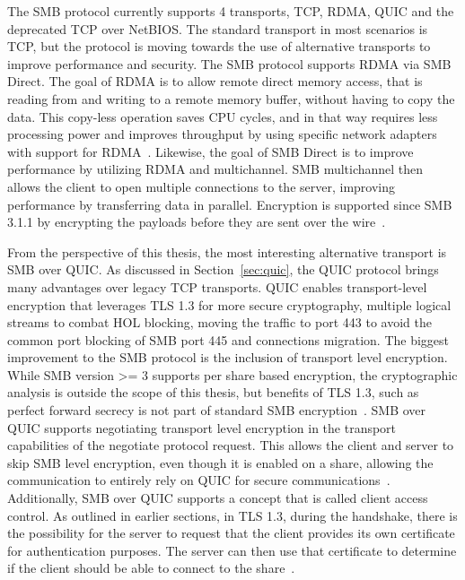 \documentclass[english, 12pt, a4paper, elec, utf8, a-2b, online]{aaltothesis}
\begin{document}
The SMB protocol currently supports 4 transports, TCP, RDMA, QUIC and the
deprecated TCP over NetBIOS. The standard transport in most scenarios is TCP,
but the protocol is moving towards the use of alternative transports to improve
performance and security. The SMB protocol supports RDMA via SMB Direct. The goal
of RDMA is to allow remote direct memory access, that is reading from and writing
to a remote memory buffer, without having to copy the data. This copy-less operation saves CPU
cycles, and in that way requires less processing power and improves throughput
by using specific network adapters with support for RDMA~\cite{rfc5040}.
Likewise, the goal of SMB Direct is to improve performance by utilizing RDMA
and multichannel. SMB multichannel then allows the client to open multiple connections
to the server, improving performance by transferring data in parallel. Encryption is
supported since SMB 3.1.1 by encrypting the payloads before they are sent over the
wire~\cite{smb_direct}.

From the perspective of this thesis, the most interesting alternative transport is
SMB over QUIC. As discussed in Section~\ref{sec:quic}, the QUIC protocol brings
many advantages over legacy TCP transports. QUIC enables transport-level encryption
that leverages TLS 1.3 for more secure cryptography, multiple logical streams
to combat HOL blocking, moving the traffic to port 443 to avoid the common port
blocking of SMB port 445 and connections migration. The biggest improvement to the
SMB protocol is the inclusion of transport level encryption. While SMB version >= 3
supports per share based encryption, the cryptographic analysis is outside the scope
of this thesis, but benefits of TLS 1.3, such as perfect forward secrecy is not
part of standard SMB encryption~\cite{smb_quic}. SMB over QUIC supports negotiating
transport level encryption in the transport capabilities of the negotiate protocol
request. This allows the client and server to skip SMB level encryption, even though
it is enabled on a share, allowing the communication to entirely rely on QUIC for
secure communications~\cite{smb2_tech}. Additionally, SMB over QUIC supports a concept
that is called client access control. As outlined in earlier sections, in TLS 1.3,
during the handshake,  there is the possibility for the server to request that the client
provides its own certificate for authentication purposes. The server can then use
that certificate to determine if the client should be able to connect to the share~\cite{smb_quic_cac}.

\clearpage
\end{document}
